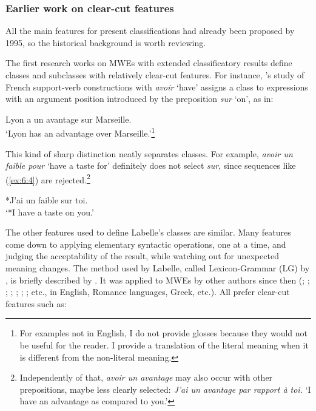 \documentclass[output=paper]{langsci/langscibook}
\begin{document}
\subsubsection{Earlier work on clear-cut features}
\label{earlierworkonfeatures}

All the main features for present classifications had already been proposed by 1995, so the historical background is worth reviewing. 

The first research works on MWEs with extended classificatory results define classes and subclasses with relatively clear-cut features. For instance, \citet{Labelle1974}'s study of French support-verb constructions with \textit{avoir} ‘have’ assigns a class to expressions with an argument position introduced by the preposition \textit{sur} ‘on’, as in:

\begin{exe}
 \ex   \label{ex:6:3}
Lyon a un avantage sur Marseille.\\
`Lyon has an advantage over Marseille.’\footnote{For examples not in English, I do not provide glosses because they would not be useful for the reader. I provide a translation of the literal meaning when it is different from the non-literal meaning.}
\end{exe}

\noindent This kind of sharp distinction neatly separates classes. For example, \textit{avoir un faible pour} ‘have a taste for’ definitely does not select \textit{sur}, since sequences like (\ref{ex:6:4}) are rejected.\footnote{Independently of that, \textit{avoir un avantage} may also occur with other prepositions, maybe less clearly selected: \textit{J’ai un avantage par rapport à toi.} ‘I have an advantage as compared to you.’} 

\begin{exe}
 \ex   \label{ex:6:4}
*J’ai un faible sur toi.\\
`*I have a taste on you.’
\end{exe}


\noindent The other features used to define Labelle’s classes are similar. Many features come down to applying elementary syntactic operations, one at a time, and judging the acceptability of the result, while watching out for unexpected meaning changes. The method used by Labelle, called Lexicon-Grammar (LG) by \citet{Guillet}, is briefly described by \citet{Gross1994}. It was applied to MWEs by other authors since then (\citealt{Meunier1977}; \citealt{Giry-Schneider1978}; \citealt{Danlos1980}; \citealt{gross1982}; \citealt{Freckleton1985}; \citealt{Machonis1985}; \citealt{Ranchhod1990}; etc., in English, Romance languages, Greek, etc.). All prefer clear-cut features such as:
\end{document}
